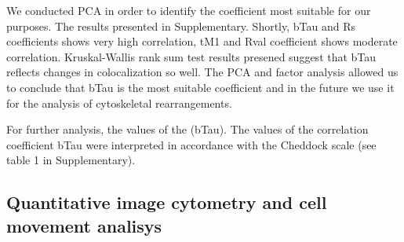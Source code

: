 \documentclass[alpha-refs]{wiley-article}
\begin{document}
We conducted PCA in order to identify the coefficient most suitable for our purposes.
The results presented in Supplementary.
Shortly, bTau and Rs coefficients shows very high correlation, tM1 and Rval coefficient shows moderate correlation.
Kruskal-Wallis rank sum test results presened suggest that bTau reflects changes in colocalization so well.
The PCA and factor analysis allowed us to conclude that bTau is the most suitable coefficient and in the future we use it for the analysis of cytoskeletal rearrangements.

For further analysis, the values of the  (bTau).
The values of the correlation coefficient bTau were interpreted in accordance with the Cheddock scale (see table 1 in Supplementary).


\subsection{Quantitative image cytometry and cell movement analisys}
\end{document}
